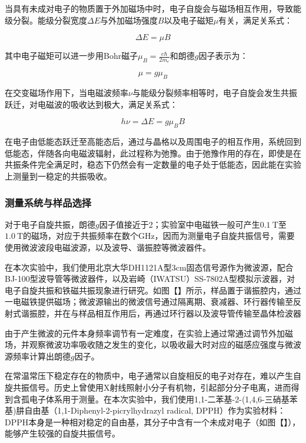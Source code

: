 \documentclass{thuemp}
\begin{document}
当具有未成对电子的物质置于外加磁场中时，电子自旋会与磁场相互作用，导致能级分裂。能级分裂宽度$\Delta E$与外加磁场强度$B$以及电子磁矩$\mu$有关，满足关系式：

\begin{equation}
\Delta E = \mu B
\end{equation}

其中电子磁矩可以进一步用Bohr磁子$\mu_B = \frac{e\hbar}{2m_e}$和朗德$g$因子表示为：

\begin{equation}
\mu = g \mu_B
\end{equation}

在交变磁场作用下，当电磁波频率$\nu$与能级分裂频率相等时，电子自旋会发生共振跃迁，对电磁波的吸收达到极大，满足关系式：

\begin{equation}
h \nu  = \Delta E = g \mu_B B
\end{equation}

在电子由低能态跃迁至高能态后，通过与晶格以及周围电子的相互作用，系统回到低能态，伴随各向电磁波辐射，此过程称为弛豫。由于弛豫作用的存在，即使是在共振条件完全满足时，稳态下仍然会有一定数量的电子处于低能态，因此能在实验上测量到一稳定的共振吸收。

\subsubsection{测量系统与样品选择}

对于电子自旋共振，朗德$g$因子值接近于2；实验室中电磁铁一般可产生$0.1 ~\text{T} $至$1.0~\text{T}$的磁场，对应于共振频率在数个\si{\giga\hertz}，因而为测量电子自旋共振信号，需要使用微波波段电磁波源，以及波导、谐振腔等微波器件。

在本次实验中，我们使用北京大华DH1121A型3\si{\centi\meter}固态信号源作为微波源，配合BJ-100型波导管等微波器件，以及岩崎（IWATSU）SS-7802A型模拟示波器，对电子自旋共振和铁磁共振现象进行研究。如图【】所示，样品置于谐振腔内，通过一电磁铁提供磁场；微波源输出的微波信号通过隔离期、衰减器、环行器传输至反射式谐振腔，并在与样品相互作用后，再通过环行器以及波导管传输至晶体检波器

由于产生微波的元件本身频率调节有一定难度，在实验上通过常通过调节外加磁场，并观察微波功率吸收随之发生的变化，以吸收最大时对应的磁感应强度与微波源频率计算出朗德$g$因子。

在常温常压下稳定存在的物质中，电子通常以自旋相反的电子对存在，难以产生自旋共振信号。历史上曾使用X射线照射小分子有机物，引起部分分子电离，进而得到含孤电子体系用于测量。在本次实验中，我们使用1,1-二苯基-2-(1,4,6-三硝基苯基)肼自由基（1,1-Diphenyl-2-picrylhydrazyl radical, DPPH）作为实验材料：DPPH本身是一种相对稳定的自由基，其分子中含有一个未成对电子（如图【】），能够产生较强的自旋共振信号。
\end{document}
